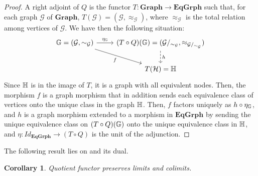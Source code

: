 \documentclass[a4paper, twoside,openright]{report}
\theoremstyle{plain}
\newtheorem{cor}[theorem]{Corollary}
\theoremstyle{definition}
\begin{document}
\begin{proof}
    A right adjoint of $Q$ is the functor $T: \mathbf{Graph \rightarrow EqGrph}$
    such that, for each graph $\mathcal{G}$ of $\mathbf{Graph}$, $T(\mathcal{G}) = (\mathcal{G}, \approx_{\mathcal{G}})$, where $\approx_{\mathcal{G}}$ is the total relation among vertices of $\mathcal{G}$. We have then the following situation:
    \[
        \begin{tikzcd}
            \eqgraph{G} = (\mathcal{G}, \sim_{\mathcal{G}}) \arrow[r, "{\eta_{\eqgraph{G}}}"] \arrow[dr, "f"swap] & (T \circ Q)(\eqgraph{G}) = (\mathcal{G}/_{\sim_{\mathcal{G}}}, \approx_{\mathcal{G}/_{\sim_{\mathcal{G}}}}) \arrow[d, dashed, "h"] \\
            & T(\mathcal{H}) = \eqgraph{H}
        \end{tikzcd}
    \]
    Since $\mathbb{H}$ is in the image of $T$, it is a graph with all equivalent nodes. Then, the morphism $f$ is a graph morphism that in addition sends each equivalence class of vertices onto the unique class in the graph $\mathbb{H}$. Then, $f$ factors uniquely as $h \circ \eta_{\mathbb{G}}$, and $h$ is a graph morphism extended to a morphism in $\mathbf{EqGrph}$ by sending the unique equivalence class on $(T \circ Q)(\mathbb{G})$ onto the unique equivalence class in $\mathbb{H}$, and $\eta: Id_{\mathbf{EqGrph}} \rightarrow (T \circ Q)$ is the unit of the adjunction.
\end{proof}

The following result lies on  and its dual.

\begin{cor}\label{cor:quot_preserves_co_lim}
    Quotient functor preserves limits and colimits. 
\end{cor}
\end{document}
